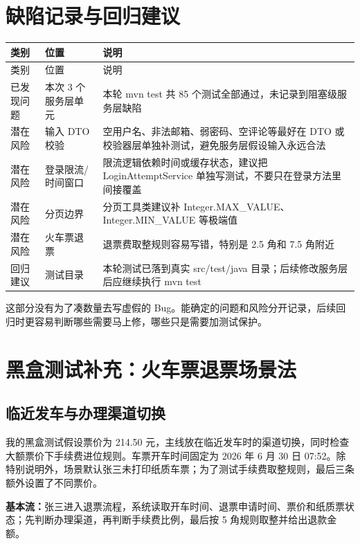 \documentclass[bwprint]{report}
\begin{document}
\section{缺陷记录与回归建议}
{
\setlength{\tabcolsep}{3pt}
\begin{longtable}{P{2.1cm}P{2.7cm}P{7.6cm}}
\toprule
类别 & 位置 & 说明\\
\midrule
\endfirsthead
\toprule
类别 & 位置 & 说明\\
\midrule
\endhead
已发现问题 & 本次 3 个服务层单元 & 本轮 mvn test 共 85 个测试全部通过，未记录到阻塞级服务层缺陷 \\
潜在风险 & 输入 DTO 校验 & 空用户名、非法邮箱、弱密码、空评论等最好在 DTO 或校验器层单独补测试，避免服务层假设输入永远合法 \\
潜在风险 & 登录限流/时间窗口 & 限流逻辑依赖时间或缓存状态，建议把 Login\hspace{0pt}Attempt\hspace{0pt}Service 单独写测试，不要只在登录方法里间接覆盖 \\
潜在风险 & 分页边界 & 分页工具类建议补 Integer.MAX\_VALUE、Integer.MIN\_VALUE 等极端值 \\
潜在风险 & 火车票退票 & 退票费取整规则容易写错，特别是 2.5 角和 7.5 角附近 \\
回归建议 & 测试目录 & 本轮测试已落到真实 src/\hspace{0pt}test/\hspace{0pt}java 目录；后续修改服务层后应继续执行 mvn test \\
\bottomrule
\end{longtable}
}
这部分没有为了凑数量去写虚假的 Bug。能确定的问题和风险分开记录，后续回归时更容易判断哪些需要马上修，哪些只是需要加测试保护。


\section{黑盒测试补充：火车票退票场景法}
\subsection{临近发车与办理渠道切换}
我的黑盒测试假设票价为 214.50 元，主线放在临近发车时的渠道切换，同时检查大额票价下手续费进位规则。车票开车时间固定为 2026 年 6 月 30 日 07:52。除特别说明外，场景默认张三未打印纸质车票；为了测试手续费取整规则，最后三条额外设置了不同票价。

\textbf{基本流：}张三进入退票流程，系统读取开车时间、退票申请时间、票价和纸质票状态；先判断办理渠道，再判断手续费比例，最后按 5 角规则取整并给出退款金额。
\end{document}
